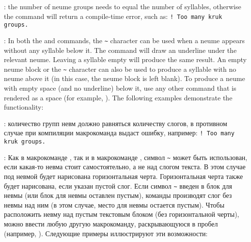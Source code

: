 \medskip

\begin{churchslavonic}
\noindent
{}
\end{churchslavonic}

\medskip

\begin{EN}
: the number of neume groups needs to equal the number of syllables, otherwise the  command will return a compile-time error, such as: \verb+! Too many kruk groups.+

: In both the  and  commands, the \verb+~+ character can be used when a neume appears without any syllable below it. The command will draw an underline under the relevant neume. Leaving a syllable empty will produce the same result. An empty neume block or the \verb+~+ character can also be used to produce a syllable with no neume above it (in this case, the neume block is left blank). To produce a neume with empty space (and no underline) below it, use any other command that is rendered as a space (for example, ). The following examples demonstrate the functionality:
\end{EN}
%
\begin{RU}
: количество групп невм должно равняться количеству слогов, в противном случае при компиляции макрокоманда выдаст ошибку, например: \verb+! Too many kruk groups.+

: Как в макрокоманде , так и в макрокоманде , символ \verb+~+ может быть использован, если какая-то невма стоит самостоятельно, а не над слогом текста. В этом случае под невмой будет нарисована горизонтальная черта. Горизонтальная черта также будет нарисована, если указан пустой слог. Если символ \verb+~+ введен в блок для невмы (или блок для невмы оставлен пустым), команды производят слог без невмы над ним (в этом случае, место для невмы остается пустым). Чтобы расположить невму над пустым текстовым блоком (без горизонтальной черты), можно ввести любую другую макрокоманду, раскрывающуюся в пробел (например, ). Следующие примеры иллюстрируют эти возможности:
\end{RU}


